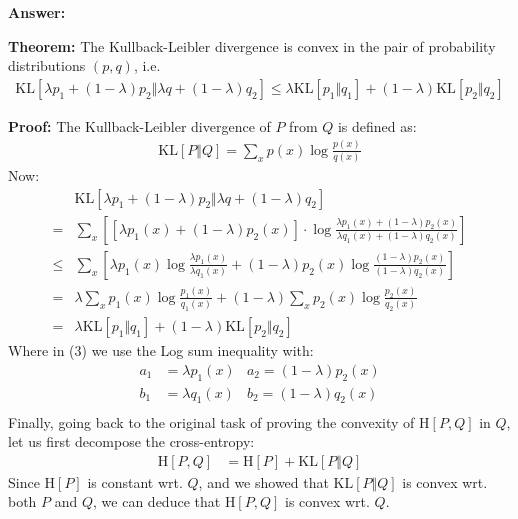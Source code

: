 \documentclass{article}
\newenvironment{QandA}{\begin{enumerate}[label=\arabic*.]}{\end{enumerate}}
\newenvironment{InnerQandA}{\begin{enumerate}[label=\roman*.]}{\end{enumerate}}
\newenvironment{answer}{\par\normalfont \textbf{Answer:}}{}
\newenvironment{theorem}{\par\normalfont \textbf{Theorem:}}{}
\newenvironment{proof}{\par\normalfont \textbf{Proof:}}{}
\newcommand{\KL}[2]{\text{KL}\left[#1 \Vert #2 \right]}
\newcommand{\CE}[2]{\text{H}\left[#1, #2 \right]}
\newcommand{\Ent}[1]{\text{H}\left[#1 \right]}
\begin{document}
\begin{QandA}
\begin{InnerQandA}
\begin{answer}
            \begin{theorem}
                The Kullback-Leibler divergence is convex in the pair of probability distributions $(p, q)$, i.e.
                \begin{align*}
                    \KL{\lambda p_1 + (1-\lambda)p_2}{\lambda q + (1-\lambda)q_2} \le \lambda \KL{p_1}{q_1} + (1-\lambda)\KL{p_2}{q_2}
                \end{align*}
            \end{theorem}
            \begin{proof}
                The Kullback-Leibler divergence of $P$ from $Q$ is defined as:
                \begin{align*}
                    \KL{P}{Q} = \sum_{x} p(x) \log \frac{p(x)}{q(x)}
                \end{align*}
                Now:
                \begin{align}
                    &\KL{\lambda p_1 + (1-\lambda)p_2}{\lambda q + (1-\lambda)q_2} \\
                    = &\sum_{x}\left[ \left[\lambda p_1(x) + (1-\lambda)p_2(x)\right] \cdot \log \frac{\lambda p_1(x) + (1-\lambda)p_2(x)}{\lambda q_1(x) + (1-\lambda)q_2(x)} \right] \\
                    \le &\sum_x \left[ \lambda p_1(x) \log \frac{\lambda p_1(x)}{\lambda q_1(x)} + (1 - \lambda) p_2(x) \log \frac{(1-\lambda) p_2(x)}{(1-\lambda) q_2(x)} \right] \\
                    = &\lambda \sum_x p_1(x) \log \frac{ p_1(x)}{q_1(x)} + (1 - \lambda) \sum_x p_2(x) \log \frac{p_2(x)}{q_2(x)}  \\
                    = &\lambda \KL{p_1}{q_1} + (1-\lambda) \KL{p_2}{q_2}
                \end{align}
                Where in (3) we use the Log sum inequality with:
                \begin{align*}
                    a_1 &= \lambda p_1(x) & a_2 = (1-\lambda) p_2(x)\\
                    b_1 &= \lambda q_1(x) & b_2 = (1-\lambda) q_2(x)\\
                \end{align*}
            \end{proof}
        Finally, going back to the original task of proving the convexity of $\CE{P}{Q}$ in $Q$, let us first decompose the cross-entropy:
        \begin{align*}
            \CE{P}{Q} &= \Ent{P} + \KL{P}{Q}
        \end{align*}
        Since $\Ent{P}$ is constant wrt. $Q$, and we showed that $\KL{P}{Q}$ is convex wrt. both $P$ and $Q$, we can deduce that $\CE{P}{Q}$ is convex wrt. $Q$.
        

\end{answer}
\end{InnerQandA}
\end{QandA}
\end{document}
